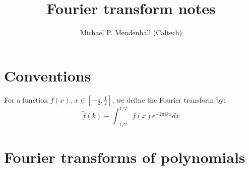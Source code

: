 \documentclass[11pt,english]{article}
\begin{document}
\title{Fourier transform notes}
\author{Michael P. Mendenhall (Caltech)}
\maketitle

\section{Conventions}

For a function $f(x)$, $x \in \left[ -\frac{1}{2}, \frac{1}{2} \right]$, we define the Fourier transform by:
\begin{equation}
	\tilde f(k) \equiv \int_{-1/2}^{1/2} f(x) e^{-2\pi i k x} dx
\end{equation}

\section{Fourier transforms of polynomials}
\end{document}
